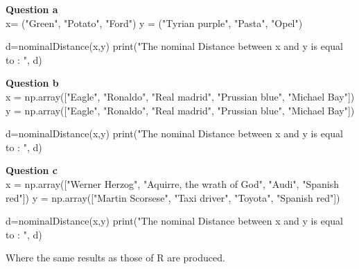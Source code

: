\documentclass[10pt,a4paper]{article}
\begin{document}
	
	\textbf{Question a}
	\\
	x= ("Green", "Potato", "Ford")
	y = ("Tyrian purple", "Pasta", "Opel")
	
	d=nominalDistance(x,y)
	print("The nominal Distance between x and y is equal to : ", d)
	
	\textbf{Question b}
	\\
	x = np.array(["Eagle",  "Ronaldo", "Real madrid", "Prussian blue", "Michael Bay"]) 
	y = np.array(["Eagle",  "Ronaldo", "Real madrid", "Prussian blue", "Michael Bay"]) 
	
	d=nominalDistance(x,y)
	print("The nominal Distance between x and y is equal to : ", d)
	
	\textbf{Question c}
	\\
	x = np.array(["Werner Herzog", "Aquirre, the wrath of God", "Audi", "Spanish red"]) 
	y = np.array(["Martin Scorsese", "Taxi driver", "Toyota", "Spanish red"]) 
	
	
	d=nominalDistance(x,y)
	print("The nominal Distance between x and y is equal to : ", d)
	
	Where the same results as those of R are produced.
	
	
\end{document}
